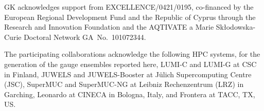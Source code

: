 \documentclass[a4paper,11pt]{article}
\begin{document}
\acknowledgments GK acknowledges support from EXCELLENCE/0421/0195,
co-financed by the European Regional Development Fund and the Republic
of Cyprus through the Research and Innovation Foundation and the
AQTIVATE a Marie Sk\l{}odowska-Curie Doctoral Network
GA~No.~101072344.

The participating collaborations acknowledge the following HPC
systems, for the generation of the gauge ensembles reported here,
LUMI-C and LUMI-G at CSC in Finland, JUWELS and JUWELS-Booster at
Jülich Supercomputing Centre (JSC), SuperMUC and SuperMUC-NG at
Leibniz Rechenzentrum (LRZ) in Garching, Leonardo at CINECA in
Bologna, Italy, and Frontera at TACC, TX, US.



\end{document}

